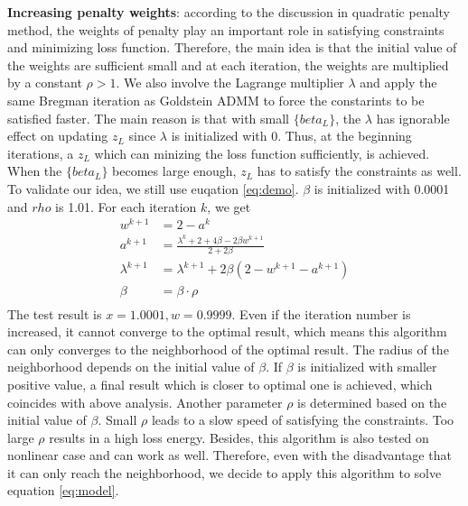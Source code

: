 \documentclass[letterpaper, 10 pt, conference]{ieeeconf}  %
\begin{document}
\textbf{Increasing penalty weights}: according to the discussion in quadratic penalty method, the weights of penalty play an important role in satisfying constraints and minimizing loss function. Therefore, the main idea is that the initial value of the weights are sufficient small and at each iteration, the weights are multiplied by a constant $\rho>1$. We also involve the Lagrange multiplier $\lambda$ and apply the same Bregman iteration as Goldstein ADMM to force the constarints to be satisfied faster. The main reason is that with small $\{beta_L\}$, the $\lambda$ has ignorable effect on updating $z_L$ since $\lambda$ is initialized with 0. Thus, at the beginning iterations, a $z_L$ which can minizing the loss function sufficiently, is achieved. When the $\{beta_L\}$ becomes large enough, $z_L$ has to satisfy the constraints as well. To validate our idea, we still use euqation \eqref{eq:demo}. $\beta$ is initialized with 0.0001 and $rho$ is 1.01. For each iteration $k$, we get
\begin{equation}
\begin{aligned}
w^{k+1} &= 2-a^k \\
a^{k+1} &= \frac{\lambda^k+2+4\beta-2\beta w^{k+1}}{2+2\beta}\\
\lambda^{k+1} &= \lambda^{k+1} + 2\beta(2-w^{k+1}-a^{k+1})\\
\beta &= \beta \cdot \rho \\
\end{aligned}
\label{eq:demoupdate}
\end{equation}
The test result is $x=1.0001, w=0.9999$. Even if the iteration number is increased, it cannot converge to the optimal result, which means this algorithm can only converges to the neighborhood of the optimal result. The radius of the neighborhood depends on the initial value of $\beta$. If $\beta$ is initialized with smaller positive value, a final result which is closer to optimal one is achieved, which coincides with above analysis. Another parameter $\rho$ is determined based on the initial value of $\beta$. Small $\rho$ leads to a slow speed of satisfying the constraints. Too large $\rho$ results in a high loss energy. Besides, this algorithm is also tested on nonlinear case and can work as well. Therefore, even with the disadvantage that it can only reach the neighborhood, we decide to apply this algorithm to solve equation \eqref{eq:model}.
\end{document}
